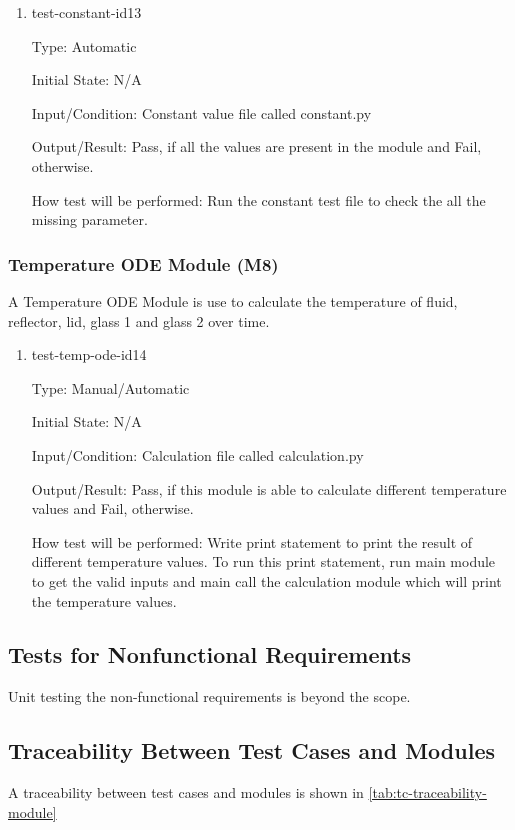 \documentclass[12pt, titlepage]{article}
\begin{document}
\begin{enumerate}

\item{test-constant-id13\\}

Type: Automatic
					
Initial State: N/A
					
Input/Condition: Constant value file called constant.py 
					
Output/Result: Pass, if all the values are present in the module and Fail, otherwise.  
					
How test will be performed: Run the constant test file to check the all the missing parameter.  

\end{enumerate}

\subsubsection{Temperature ODE Module (M8)}
A Temperature ODE Module is use to calculate the temperature of fluid, reflector, lid, glass 1 and glass 2 over time. 

\begin{enumerate}

\item{test-temp-ode-id14\\}

Type: Manual/Automatic
					
Initial State: N/A
					
Input/Condition: Calculation file called calculation.py 
					
Output/Result: Pass, if this module is able to calculate different temperature values and Fail, otherwise.  
					
How test will be performed: Write print statement to print the result of different temperature values. To run this print statement, run main module to get the valid inputs and main call the calculation module which will print the temperature values.   

\end{enumerate}

\subsection{Tests for Nonfunctional Requirements}
Unit testing the non-functional requirements is beyond the scope.

\subsection{Traceability Between Test Cases and Modules}
A traceability between test cases and modules is shown in \autoref{tab:tc-traceability-module} 
\end{document}
